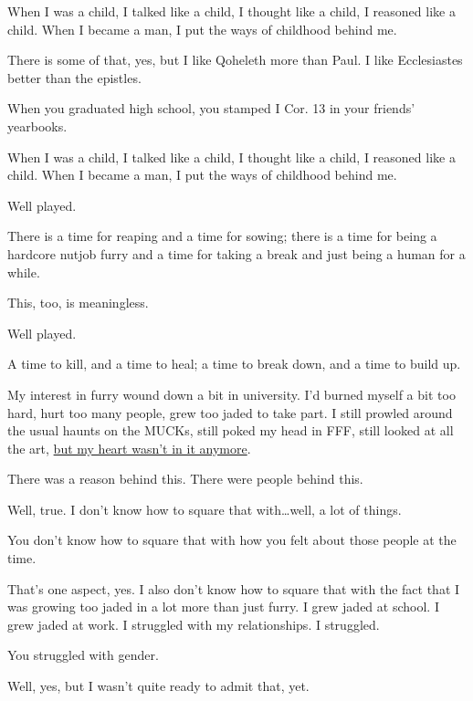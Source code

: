 \begin{paracol}{2}
\begin{leftcolumn}
\begin{ally}
When I was a child, I talked like a child, I thought like a child, I reasoned like a child. When I became a man, I put the ways of childhood behind me.
\end{ally}
There is some of that, yes, but I like Qoheleth more than Paul. I like Ecclesiastes better than the epistles.

\begin{ally}
When you graduated high school, you stamped I Cor. 13 in your friends' yearbooks.
\end{ally}
When I was a child, I talked like a child, I thought like a child, I reasoned like a child. When I became a man, I put the ways of childhood behind me.

\begin{ally}
Well played.
\end{ally}
There is a time for reaping and a time for sowing; there is a time for being a hardcore nutjob furry and a time for taking a break and just being a human for a while.

\begin{ally}
This, too, is meaningless.
\end{ally}
Well played.
\newpage

\noindent A time to kill, and a time to heal; a time to break down, and a time to build up.

My interest in furry wound down a bit in university. I'd burned myself a bit too hard, hurt too many people, grew too jaded to take part. I still prowled around the usual haunts on the MUCKs, still poked my head in FFF, still looked at all the art, \href{https://adjectivespecies.com/2012/03/21/makyos-kaddish/}{but my heart wasn't in it anymore}.

\begin{ally}
There was a reason behind this. There were people behind this.
\end{ally}
Well, true. I don't know how to square that with\ldots{}well, a lot of things.

\begin{ally}
You don't know how to square that with how you felt about those people at the time.
\end{ally}
That's one aspect, yes. I also don't know how to square that with the fact that I was growing too jaded in a lot more than just furry. I grew jaded at school. I grew jaded at work. I struggled with my relationships. I struggled.

\begin{ally}
You struggled with gender.
\end{ally}
Well, yes, but I wasn't quite ready to admit that, yet.


\end{leftcolumn}
\end{paracol}
